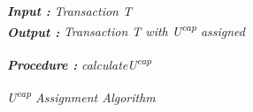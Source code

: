 %
\noindent
 \textbf{\emph{Input :}} \emph{Transaction T}\\
 \textbf{\emph{Output : }}\emph{Transaction T with U\textsuperscript{cap} assigned} \\
\begin{algorithm}
 \textbf{\emph{Procedure : }}\emph{calculateU\textsuperscript{cap}}\\
 \caption{\emph{U\textsuperscript{cap} Assignment Algorithm} }
 \label{algorithm:cap_assignment}
\end{algorithm}
%